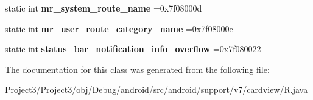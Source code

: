 \begin{DoxyCompactItemize}
static int {\bfseries mr\+\_\+system\+\_\+route\+\_\+name} =0x7f08000d
\item 
\mbox{\label{classandroid_1_1support_1_1v7_1_1cardview_1_1R_1_1string_aab1ce1c4935280ae8d042be5443eac13}} 
static int {\bfseries mr\+\_\+user\+\_\+route\+\_\+category\+\_\+name} =0x7f08000e
\item 
\mbox{\label{classandroid_1_1support_1_1v7_1_1cardview_1_1R_1_1string_a94af573f21ece8cbbbfe70e81e367a7c}} 
static int {\bfseries status\+\_\+bar\+\_\+notification\+\_\+info\+\_\+overflow} =0x7f080022
\end{DoxyCompactItemize}


The documentation for this class was generated from the following file\+:\begin{DoxyCompactItemize}
\item 
Project3/\+Project3/obj/\+Debug/android/src/android/support/v7/cardview/R.\+java\end{DoxyCompactItemize}
